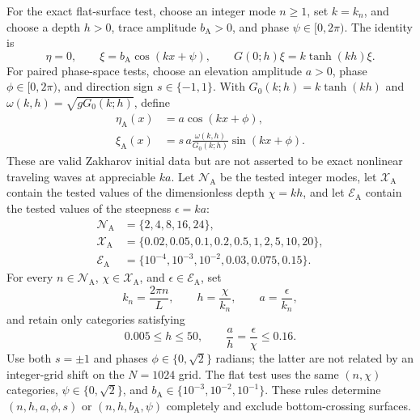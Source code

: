 \documentclass[11pt]{article}
\begin{document}
For the exact flat-surface test, choose an integer mode $n\geq1$, set
$k=k_n$, and choose a depth $h>0$, trace amplitude $b_{\mathrm A}>0$, and phase
$\psi\in[0,2\pi)$.  The identity is
\begin{equation}
  \eta=0,\qquad
  \xi=b_{\mathrm A}\cos(kx+\psi),\qquad
  G(0;h)\xi=k\tanh(kh)\xi.
  \label{eq:flat-dno-test}
\end{equation}
For paired phase-space tests, choose an elevation amplitude $a>0$, phase
$\phi\in[0,2\pi)$, and direction sign $s\in\{-1,1\}$.  With
$G_0(k;h)=k\tanh(kh)$ and
$\omega(k,h)=\sqrt{gG_0(k;h)}$, define
\begin{align}
  \eta_{\mathrm A}(x)&=a\cos(kx+\phi),\\
  \xi_{\mathrm A}(x)&=s\,a
  \frac{\omega(k,h)}{G_0(k;h)}\sin(kx+\phi).
  \label{eq:airy-constructor}
\end{align}
These are valid Zakharov initial data but are not asserted to be exact
nonlinear traveling waves at appreciable $ka$.  Let $\mathcal N_{\mathrm A}$
be the tested integer modes, let $\mathcal X_{\mathrm A}$ contain the tested
values of the dimensionless depth $\chi=kh$, and let
$\mathcal E_{\mathrm A}$ contain the tested values of the steepness
$\epsilon=ka$:
\begin{equation}
  \begin{aligned}
  \mathcal N_{\mathrm A}&=\{2,4,8,16,24\},\\
  \mathcal X_{\mathrm A}&=\{0.02,0.05,0.1,0.2,0.5,1,2,5,10,20\},\\
  \mathcal E_{\mathrm A}&=\{10^{-4},10^{-3},10^{-2},0.03,0.075,0.15\}.
  \end{aligned}
  \label{eq:airy-diagnostic-grid}
\end{equation}
For every $n\in\mathcal N_{\mathrm A}$, $\chi\in\mathcal X_{\mathrm A}$,
and $\epsilon\in\mathcal E_{\mathrm A}$, set
\begin{equation}
  k_n=\frac{2\pi n}{L},\qquad h=\frac{\chi}{k_n},\qquad
  a=\frac{\epsilon}{k_n},
\end{equation}
and retain only categories satisfying
\begin{equation}
  0.005\leq h\leq50,\qquad
  \frac{a}{h}=\frac{\epsilon}{\chi}\leq0.16.
  \label{eq:airy-feasibility}
\end{equation}
Use both $s=\pm1$ and phases $\phi\in\{0,\sqrt2\}$ radians; the latter are
not related by an integer-grid shift on the $N=1024$ grid.  The flat test
uses the same $(n,\chi)$ categories, $\psi\in\{0,\sqrt2\}$, and
$b_{\mathrm A}\in\{10^{-3},10^{-2},10^{-1}\}$.  These rules determine
$(n,h,a,\phi,s)$ or $(n,h,b_{\mathrm A},\psi)$ completely and exclude
bottom-crossing surfaces.
\end{document}
